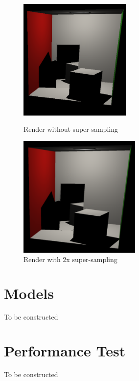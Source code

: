 \documentclass{article}
\begin{document}
    \begin{figure}[!htb]
          \includegraphics[width=\linewidth, height=6cm]{images/supersampling_non_supersampled}
          \caption*{Render without super-sampling}
        \endminipage\hfill
          \includegraphics[width=\linewidth, height=6cm]{images/supersampling_supersampled}
          \caption*{Render with 2x super-sampling}
        \endminipage
    \end{figure}

    \section{Models}
    To be constructed

    \section{Performance Test}
    To be constructed
\end{document}
